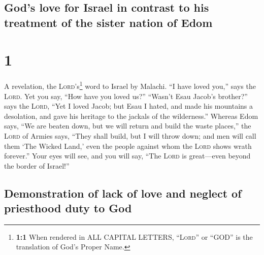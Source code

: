 \hypertarget{gods-love-for-israel-in-contrast-to-his-treatment-of-the-sister-nation-of-edom}{%
\subsection{God's love for Israel in contrast to his treatment of the
sister nation of
Edom}\label{gods-love-for-israel-in-contrast-to-his-treatment-of-the-sister-nation-of-edom}}

\hypertarget{section}{%
\section{1}\label{section}}

 A revelation, the \textsc{Lord}'s\footnote{\textbf{1:1}
  When rendered in ALL CAPITAL LETTERS, ``\textsc{Lord}'' or ``GOD'' is
  the translation of God's Proper Name.} word to Israel by Malachi.
 ``I have loved you,'' says the \textsc{Lord}. Yet you
say, ``How have you loved us?'' ``Wasn't Esau Jacob's brother?'' says
the \textsc{Lord}, ``Yet I loved Jacob;  but Esau I hated,
and made his mountains a desolation, and gave his heritage to the
jackals of the wilderness.''  Whereas Edom says, ``We are
beaten down, but we will return and build the waste places,'' the
\textsc{Lord} of Armies says, ``They shall build, but I will throw down;
and men will call them `The Wicked Land,' even the people against whom
the \textsc{Lord} shows wrath forever.''  Your eyes will
see, and you will say, ``The \textsc{Lord} is great---even beyond the
border of Israel!''

\hypertarget{demonstration-of-lack-of-love-and-neglect-of-priesthood-duty-to-god}{%
\subsection{Demonstration of lack of love and neglect of priesthood duty
to
God}\label{demonstration-of-lack-of-love-and-neglect-of-priesthood-duty-to-god}}

